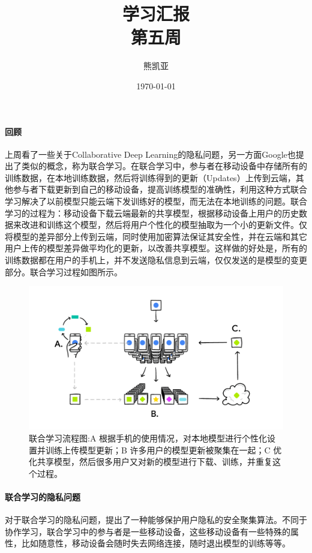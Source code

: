 \documentclass[a4paper]{article}
\title{学习汇报\\第五周}
\author{熊凯亚}
\date{\today}
\begin{document}
\maketitle

\paragraph{回顾}
上周看了一些关于Collaborative Deep Learning的隐私问题，另一方面Google也提出了类似的概念，称为联合学习。在联合学习中，参与者在移动设备中存储所有的训练数据，在本地训练数据，然后将训练得到的更新（Updates）上传到云端，其他参与者下载更新到自己的移动设备，提高训练模型的准确性，利用这种方式联合学习解决了以前模型只能云端下发训练好的模型，而无法在本地训练的问题。联合学习的过程为：移动设备下载云端最新的共享模型，根据移动设备上用户的历史数据来改进和训练这个模型，然后将用户个性化的模型抽取为一个小的更新文件。仅将模型的差异部分上传到云端，同时使用加密算法保证其安全性，并在云端和其它用户上传的模型差异做平均化的更新，以改善共享模型。这样做的好处是，所有的训练数据都在用户的手机上，并不发送隐私信息到云端，仅仅发送的是模型的变更部分。联合学习过程如图所示。
\begin{figure}[!ht]
\centering
\includegraphics[width = \linewidth]{fig/FederatedLearningFlow}
\caption{联合学习流程图:A 根据手机的使用情况，对本地模型进行个性化设置并训练上传模型更新；B 许多用户的模型更新被聚集在一起；C 优化共享模型，然后很多用户又对新的模型进行下载、训练，并重复这个过程。}
\label{fig:Google}
\end{figure}

\clearpage
\paragraph{联合学习的隐私问题}
对于联合学习的隐私问题，\cite{bonawitz2017practical}提出了一种能够保护用户隐私的安全聚集算法。不同于协作学习，联合学习中的参与者是一些移动设备，这些移动设备有一些特殊的属性，比如随意性，移动设备会随时失去网络连接，随时退出模型的训练等等。
\end{document}
